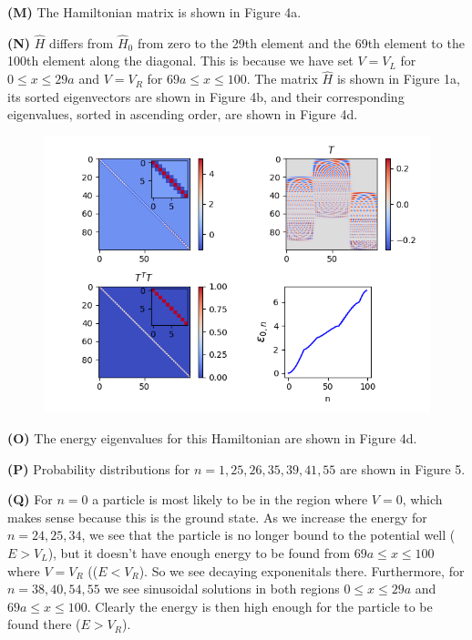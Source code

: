 \documentclass[12pt]{article}
\theoremstyle{definition}
\begin{document}
{\vspace{0.1in}
\noindent \textbf{(M)} The Hamiltonian matrix is shown in Figure 4a.

\vspace{0.1in}
\noindent \textbf{(N)} $\hat{H}$ differs from $\hat{H}_{0}$ from zero to the 29th element and the 69th element to the 100th element along the diagonal. This is because we have set $V=V_{L}$ for $0 \leq x \leq 29a$ and $V=V_{R}$ for $69a\leq x \leq 100$. The matrix $\hat{H}$ is shown in Figure 1a, its sorted eigenvectors are shown in Figure 4b, and their corresponding eigenvalues, sorted in ascending order, are shown in Figure 4d. 

\begin{figure}[t!]
\centering
\includegraphics[width=15cm]{p1_5}
\caption{}
\label{fig:method}
\end{figure}

\vspace{0.1in}
\noindent \textbf{(O)} The energy eigenvalues for this Hamiltonian are shown in Figure 4d.

\vspace{0.1in}
\noindent \textbf{(P)} Probability distributions for $n=1, 25, 26, 35, 39, 41, 55$ are shown in Figure 5.

\vspace{0.1in}
\noindent \textbf{(Q)} For $n=0$ a particle is most likely to be in the region where $V=0$, which makes sense because this is the ground state. As we increase the energy for $n=24,25,34$, we see that the particle is no longer bound to the potential well ($E > V_{L}$), but it doesn't have enough energy to be found from $69a\leq x \leq 100$ where $V=V_{R}$ (($E < V_{R}$). So we see decaying exponenitals there. Furthermore, for $n=38,40,54,55$ we see sinusoidal solutions in both regions $0 \leq x \leq 29a$ and $69a\leq x \leq 100$. Clearly the energy is then high enough for the particle to be found there ($E > V_{R}$).

}
\end{document}
